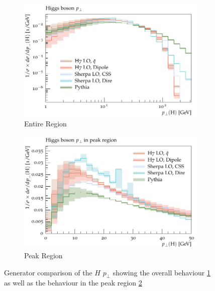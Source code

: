 \begin{figure}[h]
  \centering
  \begin{subfigure}[t]{0.49\textwidth}
    \includegraphics[width=\textwidth]{plots/H-125-MuShower/LH_H/X_pT.pdf}
    \caption{Entire Region}
    \label{fig:h:pt_full}
  \end{subfigure}
%
  \begin{subfigure}[t]{0.49\textwidth}
    \includegraphics[width=\textwidth]{plots/H-125-MuShower/LH_H/X_pT_peak.pdf}
    \caption{Peak Region}
    \label{fig:h:pt_peak}
  \end{subfigure}
  \caption{Generator comparison of the $H$ $p_\perp$ showing the overall
    behaviour \ref{fig:h:pt_full} as well as the behaviour in the peak region
    \ref{fig:h:pt_peak}}
  \label{fig:h:pt}
\end{figure}

